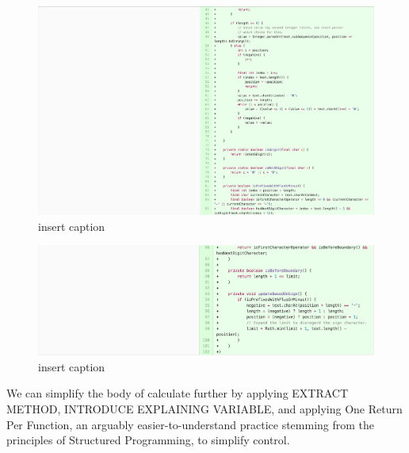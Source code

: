 \begin{figure}[H]
	\centering
	\includegraphics[width=\linewidth]{code28}
	\caption{insert caption}
\end{figure}
\begin{figure}[H]
	\centering
	\includegraphics[width=\linewidth]{code29}
	\caption{insert caption}
\end{figure}

We can simplify the body of calculate further by applying EXTRACT METHOD, INTRODUCE EXPLAINING VARIABLE, and applying One Return Per Function, an arguably easier-to-understand practice stemming from the principles of Structured Programming, to simplify control.

